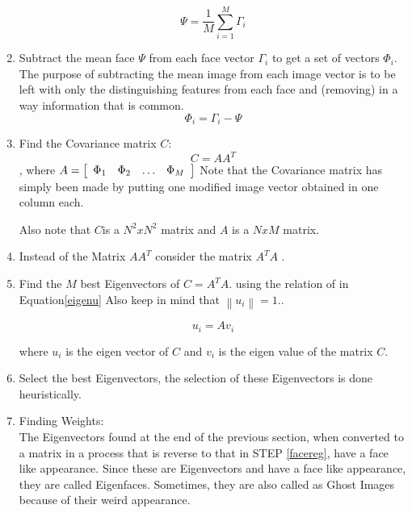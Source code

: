 \documentclass[a4paper,twoside]{article}
\begin{document}
\begin{enumerate}
\begin{equation}
\Psi  = \frac{1}{M}\sum\limits_{i = 1}^M {\Gamma _i }
\end{equation}
\item  Subtract the mean face $\Psi$ from each face vector $\Gamma_i$ to get a set of vectors $\Phi_i$. The purpose of subtracting the mean image from each image vector is to be left with only the distinguishing features from each face and (removing)  in a way information that is common.
\begin{equation}
\Phi _i  = \Gamma_i  - \Psi
\end{equation}
\item  Find the Covariance matrix $C$:
\begin{equation}
C = AA^T
\end{equation} , where $A = \left[ {\begin{array}{*{20}c}
   {\Phi _1 } & {\Phi_2} & {\dots} & {\Phi _M }  \\
\end{array}} \right]
$
Note that the Covariance matrix has simply been made by putting one modified image vector obtained in  one column each.

Also note that $C$is a $N^2xN^2$ matrix and $A$ is a $NxM$ matrix.


\item  Instead of the Matrix $AA^T$  consider the matrix $A^TA$ .


\item Find the $M$ best  Eigenvectors of $C=A^TA$. using the relation of in Equation\ref{eigenu} Also keep in mind that $\left\| {u_i} \right\| = 1.$.

\begin{equation}
 \label{eigenu}
u_i=Av_i
\end{equation}

 where  $u_i$ is the eigen vector of $C$ and $v_i$ is the eigen value of the matrix $C$.

\item Select the best  Eigenvectors, the selection of these Eigenvectors is done heuristically.

\item Finding Weights:\\

The Eigenvectors found at the end of the previous section,  when converted to a matrix in a process that is reverse to that in STEP \ref{facereg}, have a face like appearance. Since these are Eigenvectors and have a face like appearance, they are called Eigenfaces. Sometimes, they are also called as Ghost Images because of their weird appearance.


\end{enumerate}
\end{document}
